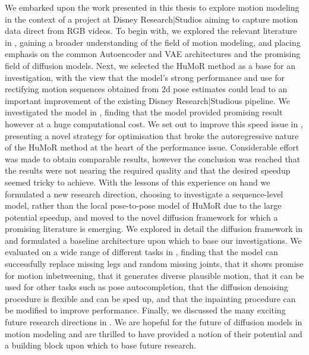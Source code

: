We embarked upon the work presented in this thesis to explore motion modeling in the context of a project at Disney Research|Studios aiming to capture motion data direct from RGB videos. To begin with, we explored the relevant literature in , gaining a broader understanding of the field of motion modeling, and placing emphasis on the common Autoencoder and VAE architectures and the promising field of diffusion models. Next, we selected the HuMoR method \cite{humor} as a base for an investigation, with the view that the model's strong performance and use for rectifying motion sequences obtained from 2d pose estimates could lead to an important improvement of the existing Disney Research|Studious pipeline. We investigated the model in , finding that the model provided promising result however at a huge computational cost. We set out to improve this speed issue in , presenting a novel strategy for optimisation that broke the autoregressive nature of the HuMoR method at the heart of the performance issue. Considerable effort was made to obtain comparable results, however the conclusion was reached that the results were not nearing the required quality and that the desired speedup seemed tricky to achieve. With the lessons of this experience on hand we formulated a new research direction, choosing to investigate a sequence-level model, rather than the local pose-to-pose model of HuMoR due to the large potential speedup, and moved to the novel diffusion framework for which a promising literature is emerging. We explored in detail the diffusion framework in  and formulated a baseline architecture upon which to base our investigations. We evaluated on a wide range of different tasks in , finding that the model can successfully replace missing legs and random missing joints, that it shows promise for motion inbetweening, that it generates diverse plausible motion, that it can be used for other tasks such as pose autocompletion, that the diffusion denoising procedure is flexible and can be sped up, and that the inpainting procedure can be modified to improve performance. Finally, we discussed the many exciting future research directions in . We are hopeful for the future of diffusion models in motion modeling and are thrilled to have provided a notion of their potential and a building block upon which to base future research.